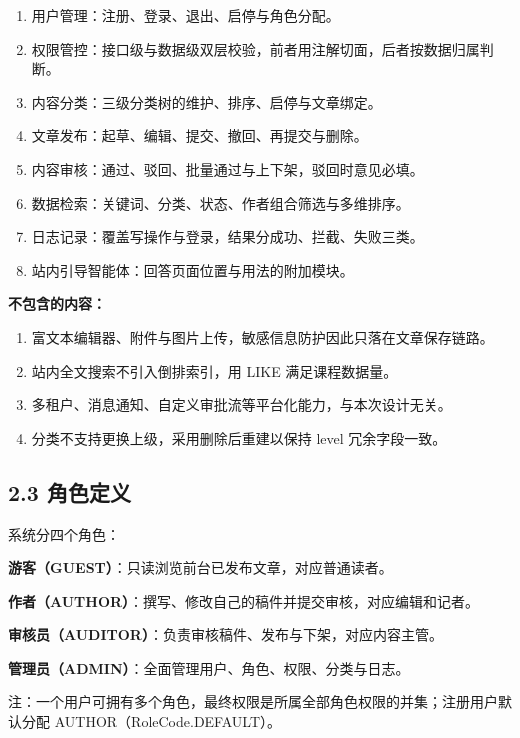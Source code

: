 \documentclass[zihao=-4,UTF8,openany]{ctexart}
\newcommand{\rone}{\ding{192}}
\newcommand{\rtwo}{\ding{193}}
\newcommand{\rthree}{\ding{194}}
\newcommand{\rfour}{\ding{195}}
\renewcommand{\_}{\textunderscore\allowbreak}
\begin{document}
\begin{enumerate}
\item 用户管理：注册、登录、退出、启停与角色分配。
\item 权限管控：接口级与数据级双层校验，前者用注解切面，后者按数据归属判断。
\item 内容分类：三级分类树的维护、排序、启停与文章绑定。
\item 文章发布：起草、编辑、提交、撤回、再提交与删除。
\item 内容审核：通过、驳回、批量通过与上下架，驳回时意见必填。
\item 数据检索：关键词、分类、状态、作者组合筛选与多维排序。
\item 日志记录：覆盖写操作与登录，结果分成功、拦截、失败三类。
\item 站内引导智能体：回答页面位置与用法的附加模块。
\end{enumerate}

\textbf{不包含的内容：}

\begin{enumerate}
\item 富文本编辑器、附件与图片上传，敏感信息防护因此只落在文章保存链路。
\item 站内全文搜索不引入倒排索引，用 LIKE 满足课程数据量。
\item 多租户、消息通知、自定义审批流等平台化能力，与本次设计无关。
\item 分类不支持更换上级，采用删除后重建以保持 level 冗余字段一致。
\end{enumerate}

\subsection*{\texorpdfstring{\textbf{2.3 角色定义}}{2.3 角色定义}}\label{ux89d2ux8272ux5b9aux4e49}

系统分四个角色：

\rone\textbf{游客（GUEST）}：只读浏览前台已发布文章，对应普通读者。

\rtwo\textbf{作者（AUTHOR）}：撰写、修改自己的稿件并提交审核，对应编辑和记者。

\rthree\textbf{审核员（AUDITOR）}：负责审核稿件、发布与下架，对应内容主管。

\rfour\textbf{管理员（ADMIN）}：全面管理用户、角色、权限、分类与日志。

注：一个用户可拥有多个角色，最终权限是所属全部角色权限的并集；注册用户默认分配 AUTHOR（RoleCode.DEFAULT）。
\end{document}
